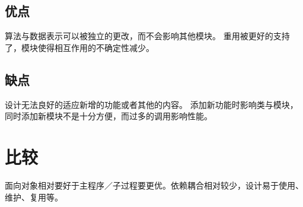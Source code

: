 \documentclass{ctexart}
\begin{document}
\subsection{优点}

算法与数据表示可以被独立的更改，而不会影响其他模块。
重用被更好的支持了，模块使得相互作用的不确定性减少。

\subsection{缺点}

设计无法良好的适应新增的功能或者其他的内容。
添加新功能时影响类与模块，同时添加新模块不是十分方便，而过多的调用影响性能。


\section{比较}
面向对象相对要好于主程序／子过程要更优。依赖耦合相对较少，设计易于使用、维护、复用等。
\end{document}
